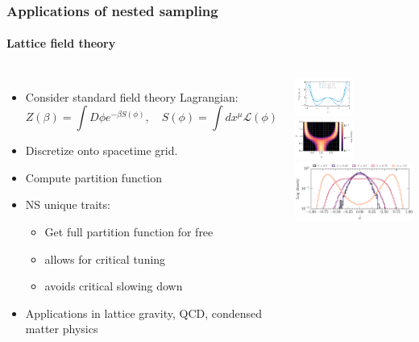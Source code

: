 \documentclass[aspectratio=169]{beamer}
\begin{document}
\begin{frame}
    \frametitle{Applications of nested sampling}
    \framesubtitle{Lattice field theory}
    \begin{columns}
        \begin{itemize}
            \item Consider standard field theory Lagrangian:
                \[ Z(\beta) = \int D\phi e^{-\beta S(\phi)}, \quad S(\phi) = \int dx^\mu \mathcal{L}(\phi) \]
            \item Discretize onto spacetime grid.
            \item Compute partition function
            \item NS unique traits:
                \begin{itemize}
                    \item Get full partition function for free
                    \item allows for critical tuning
                    \item avoids critical slowing down
                \end{itemize}
            \item Applications in lattice gravity, QCD, condensed matter physics
        \end{itemize}
        \includegraphics[width=0.49\textwidth]{figures/potential_shape}
        \includegraphics[width=0.49\textwidth]{figures/2d_phase}
        \includegraphics[width=\textwidth]{figures/lattice_field_theory.pdf}
    \end{columns}
\end{frame}
\end{document}
